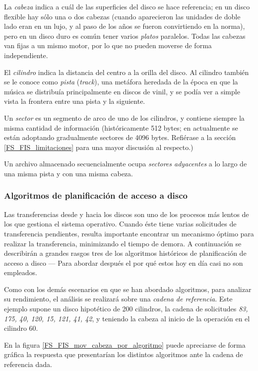 \documentclass[11pt,fleqn]{book} %
\begin{document}
La \emph{cabeza} indica a cuál de las superficies del disco se hace
referencia; en un disco flexible hay sólo una o dos cabezas (cuando
aparecieron las unidades de doble lado eran en un lujo, y al paso de
los años se fueron convirtiendo en la norma), pero en un disco duro es
común tener varios \emph{platos} paralelos. Todas las cabezas van fijas a
un mismo motor, por lo que no pueden moverse de forma independiente.

El \emph{cilindro} indica la distancia del centro a la orilla del disco. Al
cilindro también se le conoce como \emph{pista} (\emph{track}), una metáfora
heredada de la época en que la música se distribuía principalmente en
discos de vinil, y se podía ver a simple vista la frontera entre una
pista y la siguiente.

Un \emph{sector} es un segmento de arco de uno de los cilindros, y contiene
siempre la misma cantidad de información (históricamente 512 bytes; en
actualmente se están adoptando gradualmente sectores de 4096
bytes. Refiérase a la sección \ref{FS_FIS_limitaciones} para una mayor
discusión al respecto.)

Un archivo almacenado secuencialmente ocupa \emph{sectores adyacentes} a lo
largo de una misma pista y con una misma cabeza.
\subsubsection{Algoritmos de planificación de acceso a disco}
\label{sec-10-1-1-2}


Las transferencias desde y hacia los discos son uno de los procesos
más lentos de los que gestiona el sistema operativo. Cuando éste tiene
varias solicitudes de transferencia pendientes, resulta importante
encontrar un mecanismo óptimo para realizar la transferencia,
minimizando el tiempo de demora. A continuación se describirán a
grandes rasgos tres de los algoritmos históricos de planificación de
acceso a disco — Para abordar después el por qué estos hoy en día casi
no son empleados.

Como con los demás escenarios en que se han abordado algoritmos, para
analizar su rendimiento, el análisis se realizará sobre una \emph{cadena de referencia}. Este ejemplo supone un disco hipotético de 200 cilindros,
la cadena de solicitudes \emph{83, 175, 40, 120, 15, 121, 41, 42}, y
teniendo la cabeza al inicio de la operación en el cilindro 60.

En la figura \ref{FS_FIS_mov_cabeza_por_algoritmo} puede apreciarse de
forma gráfica la respuesta que presentarían los distintos algoritmos
ante la cadena de referencia dada.
\end{document}
